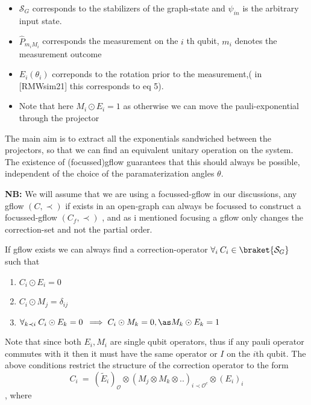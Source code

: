 \documentclass[
]{article}
\providecommand{\tightlist}{%
  \setlength{\itemsep}{0pt}\setlength{\parskip}{0pt}}
\begin{document}
\begin{itemize}
\tightlist
\item
  \(\mathcal{S}_{G}\) corresponds to the stabilizers of the graph-state
  and \(\psi_{in}\) is the arbitrary input state.\\
\item
  \(\hat{P}_{m_iM_{i}}\) corresponds the measurement on the \(i\) th
  qubit, \(m_i\) denotes the measurement outcome
\item
  \(E_i(\theta_{i})\) correponds to the rotation prior to the
  measurement,( in {[}RMWsim21{]} this corresponds to eq 5).
\item
  Note that here \(M_i \odot E_i =1\) as otherwise we can move the
  pauli-exponential through the projector
\end{itemize}

The main aim is to extract all the exponentials sandwiched between the
projectors, so that we can find an equivalent unitary operation on the
system. The existence of (focussed)gflow guarantees that this should
always be possible, independent of the choice of the paramaterization
angles \(\theta\).

\textbf{NB:} We will assume that we are using a focussed-gflow in our
discussions, any gflow \((C, \prec)\) if exists in an open-graph can
always be focussed to construct a focussed-gflow \((C_{f}, \prec)\) ,
and as i mentioned focusing a gflow only changes the correction-set and
not the partial order.

If gflow exists we can always find a correction-operator
\(\forall_i \: C_{i}\in \braket{\mathcal{S}_G}\) such that

\begin{enumerate}
\def\labelenumi{\arabic{enumi}.}
\tightlist
\item
  \(C_{i} \odot E_{i}=0\)
\item
  \(C_{i} \odot M_{j}=\delta_{ij}\)
\item
  \(\forall_{k \prec i} \: C_{i}\odot E_{k}=0 \:\implies C_{i}\odot M_{k}=0, \as M_{k}\odot E_k=1\)
\end{enumerate}

Note that since both \(E_{i},M_{i}\) are single qubit operators, thus if
any pauli operator commutes with it then it must have the same operator
or \(I\) on the \(i\)th qubit. The above conditions restrict the
structure of the correction operator to the form
\[C_{i}  \: = \: \left( \tilde{E}_i \right)_{\mathcal{O}}  \otimes \left(M_{j}\otimes M_{k}\otimes .. \right)_{i \prec \mathcal{O}^{c}} \otimes \left( E_{i}  \right)_{i} \],
where
\end{document}
